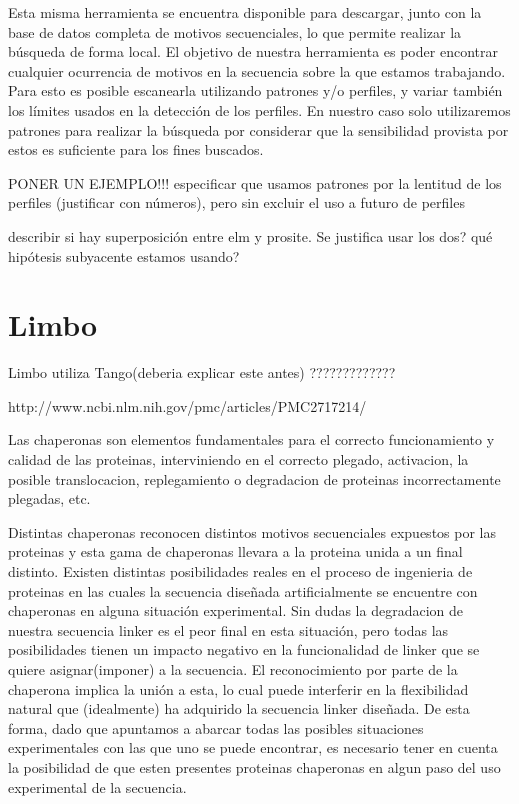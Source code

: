 Esta misma herramienta se encuentra disponible para descargar, junto con la base de datos completa de motivos secuenciales, lo que permite realizar la búsqueda de forma local.
El objetivo de nuestra herramienta es poder encontrar cualquier ocurrencia de motivos en la secuencia sobre la que estamos trabajando. Para esto es posible escanearla utilizando patrones y/o perfiles, y variar también los límites usados en la detección de los perfiles. En nuestro caso solo utilizaremos patrones para realizar la búsqueda por considerar que la sensibilidad provista por estos es suficiente para los fines buscados.

PONER UN EJEMPLO!!! especificar que usamos patrones por la lentitud de los perfiles (justificar con números), pero sin excluir el uso a futuro de perfiles

describir si hay superposición entre elm y prosite. Se justifica usar los dos? qué hipótesis subyacente estamos usando?

\section{Limbo}

Limbo utiliza Tango(deberia explicar este antes) ?????????????

http://www.ncbi.nlm.nih.gov/pmc/articles/PMC2717214/

Las chaperonas son elementos fundamentales para el correcto funcionamiento y calidad de las proteinas, interviniendo en el correcto plegado, activacion, la posible translocacion, replegamiento o degradacion de proteinas incorrectamente plegadas, etc.

Distintas chaperonas reconocen distintos motivos secuenciales expuestos por las proteinas y esta gama de chaperonas llevara a la proteina unida a un final distinto.
Existen distintas posibilidades reales en el proceso de ingenieria de proteinas en las cuales la secuencia diseñada artificialmente se encuentre con chaperonas en alguna situación experimental. Sin dudas la degradacion de nuestra secuencia linker es el peor final en esta situación, pero todas las posibilidades tienen un impacto negativo en la funcionalidad de linker que se quiere asignar(imponer) a la secuencia. El reconocimiento por parte de la chaperona implica la unión a esta, lo cual puede interferir en la flexibilidad natural que (idealmente) ha adquirido la secuencia linker diseñada. 
De esta forma, dado que apuntamos a abarcar todas las posibles situaciones experimentales con las que uno se puede encontrar, es necesario tener en cuenta la posibilidad de que esten presentes proteinas chaperonas en algun paso del uso experimental de la secuencia. 
 
